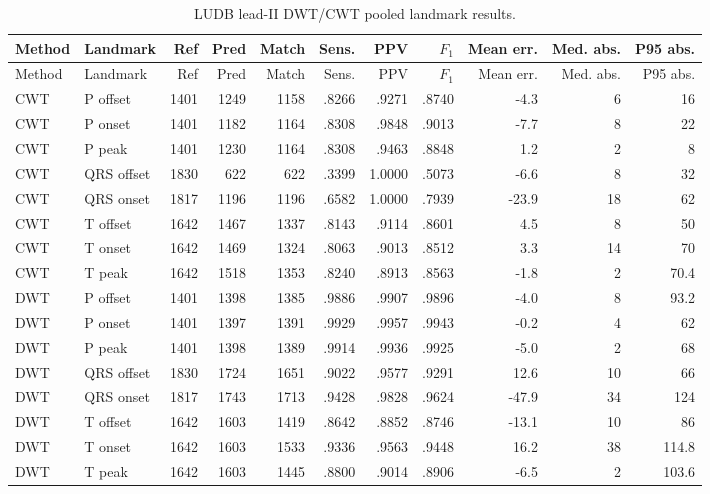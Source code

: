 \documentclass[11pt,a4paper]{article}
\begin{document}
\begin{landscape}
\begin{longtable}{llrrrrrrrrr}
\caption{LUDB lead-II DWT/CWT pooled landmark results.}\label{tab:ludbdwtcwt}\\
\toprule
Method & Landmark & Ref & Pred & Match & Sens. & PPV & $F_1$ & Mean err. & Med. abs. & P95 abs. \\
\midrule
\endfirsthead
\toprule
Method & Landmark & Ref & Pred & Match & Sens. & PPV & $F_1$ & Mean err. & Med. abs. & P95 abs. \\
\midrule
\endhead
CWT & P offset & 1401 & 1249 & 1158 & .8266 & .9271 & .8740 & -4.3 & 6 & 16 \\
CWT & P onset & 1401 & 1182 & 1164 & .8308 & .9848 & .9013 & -7.7 & 8 & 22 \\
CWT & P peak & 1401 & 1230 & 1164 & .8308 & .9463 & .8848 & 1.2 & 2 & 8 \\
CWT & QRS offset & 1830 & 622 & 622 & .3399 & 1.0000 & .5073 & -6.6 & 8 & 32 \\
CWT & QRS onset & 1817 & 1196 & 1196 & .6582 & 1.0000 & .7939 & -23.9 & 18 & 62 \\
CWT & T offset & 1642 & 1467 & 1337 & .8143 & .9114 & .8601 & 4.5 & 8 & 50 \\
CWT & T onset & 1642 & 1469 & 1324 & .8063 & .9013 & .8512 & 3.3 & 14 & 70 \\
CWT & T peak & 1642 & 1518 & 1353 & .8240 & .8913 & .8563 & -1.8 & 2 & 70.4 \\
DWT & P offset & 1401 & 1398 & 1385 & .9886 & .9907 & .9896 & -4.0 & 8 & 93.2 \\
DWT & P onset & 1401 & 1397 & 1391 & .9929 & .9957 & .9943 & -0.2 & 4 & 62 \\
DWT & P peak & 1401 & 1398 & 1389 & .9914 & .9936 & .9925 & -5.0 & 2 & 68 \\
DWT & QRS offset & 1830 & 1724 & 1651 & .9022 & .9577 & .9291 & 12.6 & 10 & 66 \\
DWT & QRS onset & 1817 & 1743 & 1713 & .9428 & .9828 & .9624 & -47.9 & 34 & 124 \\
DWT & T offset & 1642 & 1603 & 1419 & .8642 & .8852 & .8746 & -13.1 & 10 & 86 \\
DWT & T onset & 1642 & 1603 & 1533 & .9336 & .9563 & .9448 & 16.2 & 38 & 114.8 \\
DWT & T peak & 1642 & 1603 & 1445 & .8800 & .9014 & .8906 & -6.5 & 2 & 103.6 \\
\bottomrule
\end{longtable}
\end{landscape}
\end{document}
